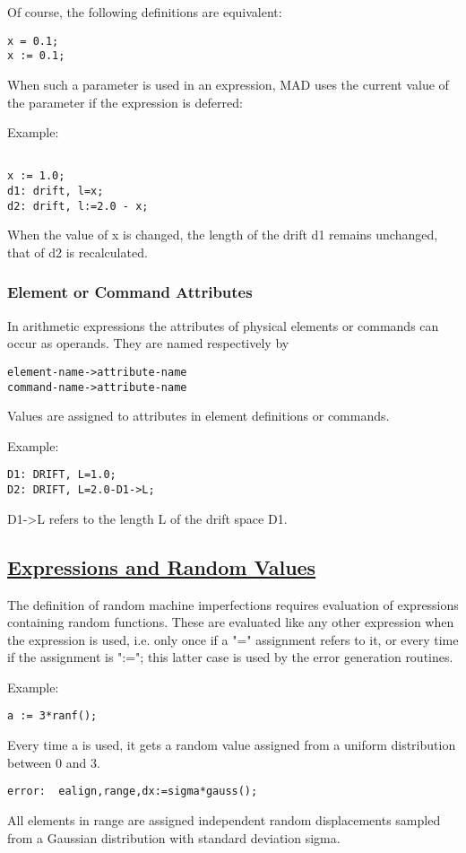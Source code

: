 Of course, the following definitions are equivalent:  
\begin{verbatim}
x = 0.1;
x := 0.1;
\end{verbatim}

When such a parameter is used in an expression, MAD uses the current
value of the parameter if the expression is deferred:  

Example: 
\begin{verbatim}

x := 1.0;
d1: drift, l=x;
d2: drift, l:=2.0 - x;
\end{verbatim} 
When the value of x is changed, the length of the drift d1 remains
unchanged, that of d2 is recalculated.   

\subsubsection{Element or Command Attributes} 
In arithmetic expressions the attributes of physical elements or
commands can occur as operands. They are named respectively by  
\begin{verbatim}
element-name->attribute-name
command-name->attribute-name
\end{verbatim} 

Values are assigned to attributes in element definitions or commands. 

Example: 
\begin{verbatim}
D1: DRIFT, L=1.0;
D2: DRIFT, L=2.0-D1->L;
\end{verbatim} 
D1-\textgreater L refers to the length L of the drift space D1.  

\subsection{\href{defer}{Expressions and Random Values}} 
The definition of random machine imperfections requires evaluation of
expressions containing random functions. These are evaluated like any
other expression when the expression is used, i.e. only once if a "="
assignment refers to it, or every time if the assignment is ":="; this
latter case is used by the error generation routines.  

Example: 
\begin{verbatim}
a := 3*ranf();
\end{verbatim} 
Every time a is used, it gets a random value assigned from a uniform
distribution between 0 and 3.  

\begin{verbatim}
error:  ealign,range,dx:=sigma*gauss();
\end{verbatim} 
All elements in range are assigned independent random displacements
sampled from a Gaussian distribution with standard deviation sigma.  


